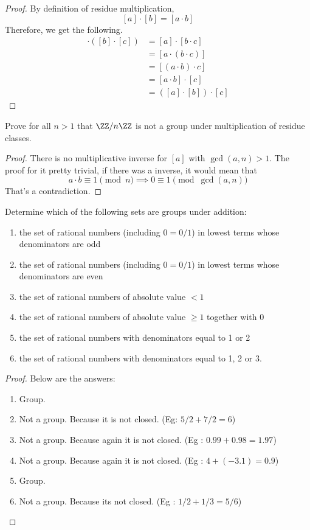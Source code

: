 \begin{proof}
     By definition of residue multiplication,
    \[ [a]\cdot[b]= [a \cdot b] \]
    Therefore, we get the following.
    \begin{align*}
        [a]\cdot ([b] \cdot [c]) &= [a]\cdot [b \cdot c] \\
        &= [a \cdot (b \cdot c) ] \\
        &= [(a \cdot b) \cdot c] \\
        &= [a \cdot b] \cdot [c] \\
        &= ([a] \cdot [b]) \cdot [c]
    \end{align*}
\end{proof}

\begin{problem}
    Prove for all $n > 1$ that $\ZZ/n\ZZ$ is not a group under multiplication of residue classes.
\end{problem}

\begin{proof}
    There is no multiplicative inverse for $[a]$ with $\gcd(a,n)>1$. The proof for it pretty trivial,
    if there was a inverse, it would mean that
    \[ a \cdot b \equiv 1 \pmod{n} \implies 0 \equiv 1 \pmod{\gcd(a,n)} \]
    That's a contradiction. 
\end{proof}

\begin{problem}
    Determine which of the following sets are groups under addition:
    \begin{enumerate}
        \item the set of rational numbers (including $0 = 0/1$) in lowest terms whose denominators are odd
        \item the set of rational numbers (including $0 = 0/1$) in lowest terms whose denominators are even
        \item the set of rational numbers of absolute value $< 1$
        \item the set of rational numbers of absolute value $\ge 1$ together with 0
        \item the set of rational numbers with denominators equal to 1 or 2
        \item the set of rational numbers with denominators equal to 1, 2 or 3.
    \end{enumerate}
\end{problem}

\begin{proof}
    Below are the answers: 
    \begin{enumerate}
        \item Group.
        \item Not a group. Because it is not closed. (Eg: $5/2 + 7/2 = 6$)
        \item Not a group. Because again it is not closed. (Eg : $0.99+0.98=1.97$)
        \item Not a group. Because again it is not closed. (Eg : $4+(-3.1)=0.9$)
        \item Group.
        \item Not a group. Because its not closed. (Eg : $1/2+1/3=5/6$)
    \end{enumerate}
\end{proof}

